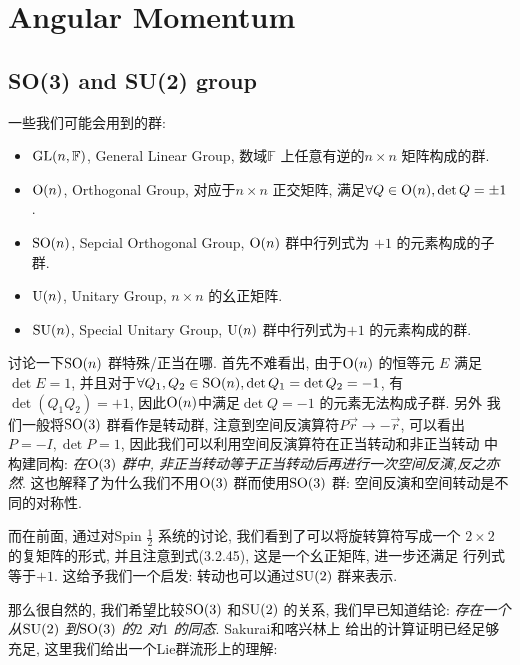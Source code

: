 \section{Angular Momentum}

\subsection{SO(3) and SU(2) group}

一些我们可能会用到的群:

\begin{itemize}
  \item ${\rm GL}(n, \mathbb{F})$, General Linear Group, 数域$\mathbb{F}$ 上任意有逆的$n\times n$ 矩阵构成的群.
  \item ${\rm O}(n)$, Orthogonal Group, 对应于$n\times n$ 正交矩阵, 满足$\forall Q\in {\rm O}(n), \det Q = \pm 1$.
  \item ${\rm SO}(n)$, Sepcial Orthogonal Group, ${\rm O}(n)$ 群中行列式为 $+1$ 的元素构成的子群.
  \item ${\rm U}(n)$, Unitary Group, $n\times n$ 的幺正矩阵.
  \item ${\rm SU}(n)$, Special Unitary Group, ${\rm U}(n)$ 群中行列式为$+1$ 的元素构成的群.
\end{itemize}

\begin{remark}
  讨论一下${\rm SO}(n)$ 群特殊/正当在哪. 首先不难看出, 由于${\rm O}(n)$ 的恒等元 $E$ 满足
  $\det E = 1$,  并且对于$\forall Q_1, Q_2\in {\rm SO}(n), \det Q_1 = \det Q_2 = -1$,
  有$\det(Q_1 Q_2) = +1$, 因此${\rm O}(n)$中满足$\det Q=-1$ 的元素无法构成子群. 另外
  我们一般将${\rm SO}(3)$ 群看作是转动群, 注意到空间反演算符$P \vec{r} \to -\vec{r}$,
  可以看出$P = -I, \det P = 1$, 因此我们可以利用空间反演算符在正当转动和非正当转动
  中构建同构: \emph{在${\rm O}(3)$ 群中, 非正当转动等于正当转动后再进行一次空间反演,反之亦然}.
  这也解释了为什么我们不用${\rm O}(3)$ 群而使用${\rm SO}(3)$ 群: 空间反演和空间转动是不同的对称性.
\end{remark}

而在前面, 通过对Spin $\frac{1}{2}$ 系统的讨论, 我们看到了可以将旋转算符写成一个
$2\times 2$ 的复矩阵的形式, 并且注意到式(3.2.45), 这是一个幺正矩阵, 进一步还满足
行列式等于$+1$. 这给予我们一个启发: 转动也可以通过${\rm SU}(2)$ 群来表示.

那么很自然的, 我们希望比较${\rm SO}(3)$ 和${\rm SU}(2)$ 的关系, 我们早已知道结论:
\emph{存在一个从${\rm SU}(2)$ 到${\rm SO}(3)$ 的$2$ 对$1$ 的同态}. Sakurai和喀兴林上
给出的计算证明已经足够充足, 这里我们给出一个Lie群流形上的理解:

